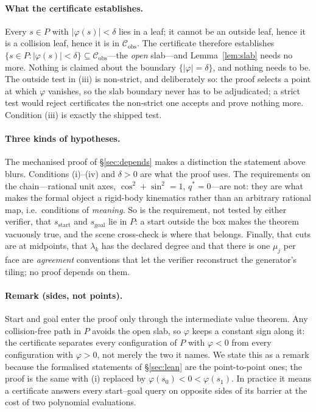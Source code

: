 \documentclass[10pt,twocolumn,letterpaper]{article}
\newcommand{\Cobs}{\mathcal{C}_{\mathrm{obs}}}
\newcommand{\vphi}{\varphi}
\newif\ifhl \hlfalse  %
\newcommand{\new}[1]{\ifhl{\color{blue!65!black}#1}\else#1\fi}
\begin{document}
\paragraph{What the certificate establishes.} Every $s\in P$ with $|\vphi(s)|<\delta$ lies in a leaf; it cannot be an outside leaf, hence it is a collision leaf, hence it is in $\Cobs$. The certificate therefore establishes $\{s\in P:|\vphi(s)|<\delta\}\subseteq\Cobs$---the \emph{open} slab---and Lemma~\ref{lem:slab} needs no more. Nothing is claimed about the boundary $\{|\vphi|=\delta\}$, and nothing needs to be. The outside test in (iii) is non-strict, and deliberately so: the proof selects a point at which $\vphi$ vanishes, so the slab boundary never has to be adjudicated; a strict test would reject certificates the non-strict one accepts and prove nothing more. Condition (iii) is exactly the shipped test.

\paragraph{Three kinds of hypotheses.} \new{The mechanised proof of \S\ref{sec:depends} makes a distinction the statement above blurs. Conditions (i)--(iv) and $\delta>0$ are what the proof uses. The requirements on the chain---rational unit axes, $\cos^2+\sin^2=1$, $q^*=0$---are not: they are what makes the formal object a rigid-body kinematics rather than an arbitrary rational map, i.e.\ conditions of \emph{meaning}. So is the requirement, not tested by either verifier, that $s_{\mathrm{start}}$ and $s_{\mathrm{goal}}$ lie in $P$: a start outside the box makes the theorem vacuously true, and the scene cross-check is where that belongs. Finally, that cuts are at midpoints, that $\lambda_k$ has the declared degree and that there is one $\mu_j$ per face are \emph{agreement} conventions that let the verifier reconstruct the generator's tiling; no proof depends on them.}

\paragraph{Remark (sides, not points).} \new{Start and goal enter the proof only through the intermediate value theorem. Any collision-free path in $P$ avoids the open slab, so $\vphi$ keeps a constant sign along it: the certificate separates every configuration of $P$ with $\vphi<0$ from every configuration with $\vphi>0$, not merely the two it names. We state this as a remark because the formalised statements of \S\ref{sec:lean} are the point-to-point ones; the proof is the same with (i) replaced by $\vphi(s_0)<0<\vphi(s_1)$. In practice it means a certificate answers every start--goal query on opposite sides of its barrier at the cost of two polynomial evaluations.}
\end{document}
